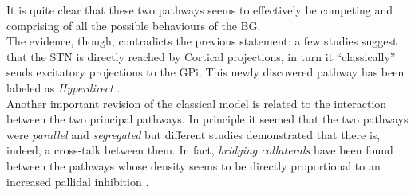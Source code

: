\documentclass[MSc,english]{Container/thesistemplate}
\begin{document}
It is quite clear that these two pathways seems to effectively be competing and comprising of all the possible behaviours of the BG. 
\\The evidence, though, contradicts the previous statement: a few studies suggest that the STN is directly reached by Cortical projections, in turn it ``classically'' sends excitatory projections to the GPi. This newly discovered pathway has been labeled as \emph{Hyperdirect} \cite{simonyan}.
\\Another important revision of the classical model is related to the interaction between the two principal pathways. In principle it seemed that the two pathways were \emph{parallel} and \emph{segregated} but different studies demonstrated that there is, indeed, a cross-talk between them. In fact, \emph{bridging collaterals} have been found between the pathways whose density seems to be directly proportional to an increased pallidal inhibition \cite{simonyan}.
\end{document}
